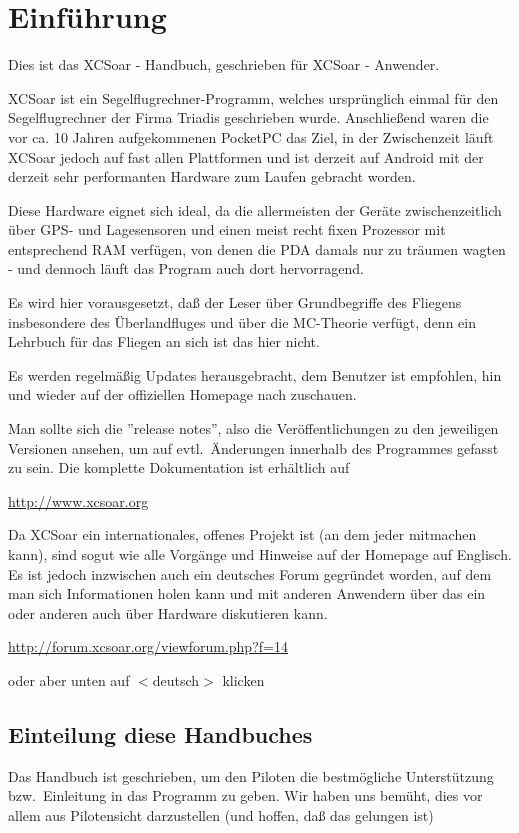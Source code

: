 \chapter{Einführung}\label{cha:introduction}
Dies ist das \textsf{XCSoar} - Handbuch, geschrieben für \textsf{XCSoar} - Anwender. 

 

\textsf{XCSoar} ist ein Segelflugrechner-Programm, welches ursprünglich einmal für den Segelflugrechner \al der Firma Triadis geschrieben wurde.  
Anschließend waren die vor ca. 10 Jahren aufgekommenen PocketPC das Ziel, in der Zwischenzeit läuft \textsf{XCSoar} jedoch auf fast allen Plattformen und ist derzeit auf Android mit der derzeit 
sehr performanten Hardware zum Laufen gebracht worden. 

Diese Hardware eignet sich ideal, da die allermeisten der Geräte zwischenzeitlich über GPS- und Lagesensoren und einen 
meist recht fixen Prozessor mit entsprechend RAM verfügen, von denen die PDA damals nur zu träumen wagten - und dennoch 
läuft das Program auch dort hervorragend. 


Es wird hier vorausgesetzt, daß der Leser über Grundbegriffe des Fliegens insbesondere des Überlandfluges 
und über die MC-Theorie verfügt, denn ein Lehrbuch für das Fliegen an sich ist das hier nicht.


Es werden regelmäßig Updates herausgebracht, dem Benutzer ist empfohlen, hin und wieder auf der offiziellen Homepage nach zuschauen. 

Man sollte sich die ''release notes'', also die Veröffentlichungen zu den jeweiligen Versionen ansehen, um  auf evtl.\ Änderungen innerhalb des Programmes gefasst zu sein. 
Die komplette Dokumentation ist erhältlich auf  
\begin{center}
\url{http://www.xcsoar.org}
\end{center}
Da \textsf{XCSoar} ein internationales, offenes Projekt ist (an dem jeder mitmachen kann), sind sogut wie alle Vorgänge und Hinweise auf der Homepage auf Englisch. 
Es ist jedoch inzwischen auch ein deutsches Forum gegründet worden, auf dem man sich Informationen holen kann und mit anderen Anwendern über das ein oder anderen auch über Hardware diskutieren kann.
\begin{center}
\url{http://forum.xcsoar.org/viewforum.php?f=14}
\end{center}
oder aber unten auf $<$deutsch$>$ klicken

\section{Einteilung diese Handbuches}
Das Handbuch ist geschrieben, um den Piloten die bestmögliche Unterstützung bzw.\ Einleitung in das Programm zu geben. 
Wir haben uns bemüht, dies vor allem aus Pilotensicht darzustellen (und hoffen, daß das gelungen ist) 

